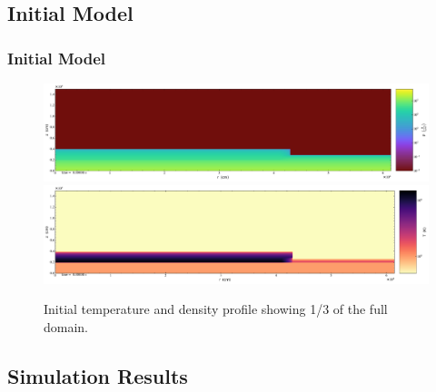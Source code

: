 \documentclass[
	11pt, %
]{beamer}
\begin{document}
\subsection{Initial Model}


\begin{frame}
\frametitle{Initial Model}

    \begin{figure}
        \centering
        \includegraphics[width=1\linewidth]{init_rho.pdf}
        \includegraphics[width=1\linewidth]{init_temp.pdf}
        \caption{Initial temperature and density profile showing 1/3 of the full domain.}
    \end{figure}

\end{frame}



\subsection{Simulation Results}


\end{document}
